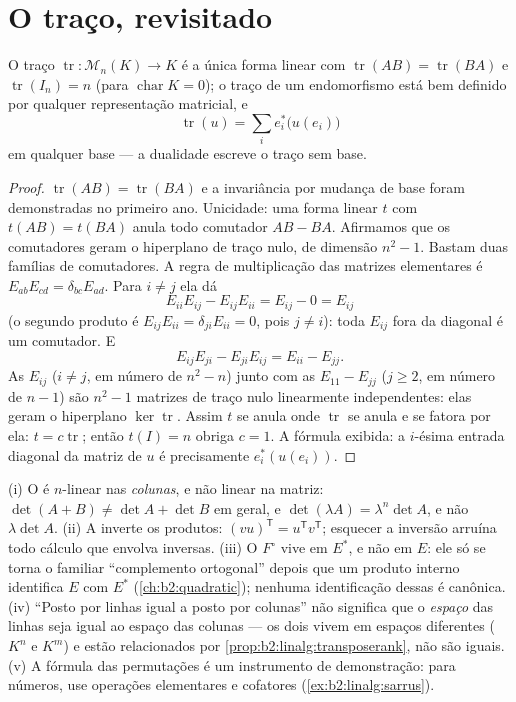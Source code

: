 \section{O traço, revisitado}

\begin{proposition}\label{prop:b2:linalg:trace}
O traço $\operatorname{tr} \colon \mathcal{M}_n(K) \to K$ é a
única forma linear com $\operatorname{tr}(AB) =
\operatorname{tr}(BA)$ e $\operatorname{tr}(I_n) = n$ (para
$\operatorname{char} K = 0$); o traço de um endomorfismo está bem
definido por qualquer representação matricial, e
\[
\operatorname{tr}(u) = \sum_{i} e_i^*\bigl(u(e_i)\bigr)
\]
em qualquer base --- a dualidade escreve o traço sem base.
\end{proposition}

\begin{proof}
$\operatorname{tr}(AB) = \operatorname{tr}(BA)$ e a invariância por mudança de base
foram demonstradas no primeiro ano. Unicidade: uma forma linear $t$ com $t(AB) =
t(BA)$ anula todo comutador $AB - BA$. Afirmamos que os comutadores
geram o hiperplano de traço nulo, de dimensão $n^2 - 1$. Bastam duas
famílias de comutadores. A regra de multiplicação das
matrizes elementares é $E_{ab}E_{cd} = \delta_{bc}E_{ad}$. Para
$i \neq j$ ela dá
\[
E_{ii}E_{ij} - E_{ij}E_{ii} = E_{ij} - 0 = E_{ij}
\]
(o segundo produto é $E_{ij}E_{ii} = \delta_{ji}E_{ii} = 0$,
pois $j \neq i$): toda $E_{ij}$ fora da diagonal é um comutador.
E
\[
E_{ij}E_{ji} - E_{ji}E_{ij} = E_{ii} - E_{jj} .
\]
As $E_{ij}$ ($i \neq j$, em número de $n^2 - n$) junto com as
$E_{11} - E_{jj}$ ($j \geq 2$, em número de $n - 1$) são $n^2 - 1$
matrizes de traço nulo linearmente independentes: elas geram o
hiperplano $\ker\operatorname{tr}$. Assim $t$ se anula onde
$\operatorname{tr}$ se anula e se fatora por ela: $t =
c\operatorname{tr}$; então $t(I) = n$ obriga $c = 1$. A fórmula exibida:
a $i$-ésima entrada diagonal da matriz de $u$ é precisamente
$e_i^*(u(e_i))$.
\end{proof}

\begin{remark}\label{rem:b2:linalg:pitfalls}
(i) O  é $n$-linear nas \emph{colunas}, e não
linear na matriz: $\det(A + B) \neq \det A + \det B$ em
geral, e $\det(\lambda A) = \lambda^n\det A$, e não
$\lambda\det A$. (ii) A  inverte os produtos:
$(vu)^{\mathsf T} = u^{\mathsf T}v^{\mathsf T}$; esquecer a
inversão arruína todo cálculo que envolva inversas. (iii) O
 $F^\circ$ vive em $E^*$, e não em $E$: ele só se torna o
familiar ``complemento ortogonal'' depois que um produto interno
identifica $E$ com $E^*$ (\cref{ch:b2:quadratic}); nenhuma
identificação dessas é canônica. (iv) ``Posto por linhas igual a posto
por colunas'' não significa que o \emph{espaço} das linhas seja igual ao espaço das colunas ---
os dois vivem em espaços diferentes ($K^n$ e $K^m$) e estão
relacionados por \cref{prop:b2:linalg:transposerank}, não são iguais.
(v) A fórmula das permutações é um instrumento de demonstração: para números, use
operações elementares e cofatores (\cref{ex:b2:linalg:sarrus}).
\end{remark}

